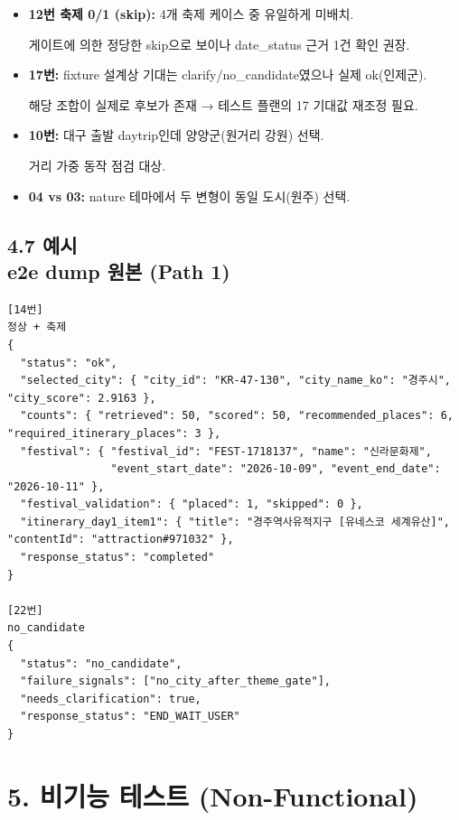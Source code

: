\documentclass[12pt,a4paper]{article}
\newcommand{\DocNeedspace}[1]{\par\ifdim\dimexpr\pagegoal-\pagetotal\relax<#1\newpage\fi}
\providecommand{\tightlist}{\setlength{\itemsep}{0pt}\setlength{\parskip}{0pt}}
\newcommand{\SubsectionBreak}[2]{\texorpdfstring{#1\\[-0.10em]{\normalsize #2}}{#1 #2}}
\begin{document}
\begin{itemize}
\tightlist
\item
  \textbf{12번 축제 0/1 (skip):} 4개 축제 케이스 중 유일하게 미배치.\par\noindent
  게이트에 의한 정당한 skip으로 보이나 date\_status 근거 1건 확인 권장.
\item
  \textbf{17번:} fixture 설계상 기대는 clarify/no\_candidate였으나 실제 ok(인제군).\par\noindent
  해당 조합이 실제로 후보가 존재 → 테스트 플랜의 17 기대값 재조정 필요.
\item
  \textbf{10번:} 대구 출발 daytrip인데 양양군(원거리 강원) 선택.\par\noindent
  거리 가중 동작 점검 대상.
\item
  \textbf{04 vs 03:} nature 테마에서 두 변형이 동일 도시(원주) 선택.
\end{itemize}

\DocNeedspace{6\baselineskip}
\subsection*{\SubsectionBreak{4.7 예시}{e2e dump 원본 (Path 1)}}

\begin{verbatim}
[14번]
정상 + 축제
{
  "status": "ok",
  "selected_city": { "city_id": "KR-47-130", "city_name_ko": "경주시", "city_score": 2.9163 },
  "counts": { "retrieved": 50, "scored": 50, "recommended_places": 6, "required_itinerary_places": 3 },
  "festival": { "festival_id": "FEST-1718137", "name": "신라문화제",
                "event_start_date": "2026-10-09", "event_end_date": "2026-10-11" },
  "festival_validation": { "placed": 1, "skipped": 0 },
  "itinerary_day1_item1": { "title": "경주역사유적지구 [유네스코 세계유산]", "contentId": "attraction#971032" },
  "response_status": "completed"
}

[22번]
no_candidate
{
  "status": "no_candidate",
  "failure_signals": ["no_city_after_theme_gate"],
  "needs_clarification": true,
  "response_status": "END_WAIT_USER"
}
\end{verbatim}


\newpage
\DocNeedspace{8\baselineskip}
\section*{5. 비기능 테스트 (Non-Functional)}
\end{document}
